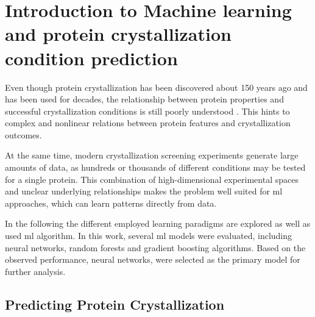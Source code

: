 \section{Introduction to Machine learning and protein crystallization condition prediction}\label{sec:machine_learning}
Even though protein crystallization has been discovered about 150 years ago and has been used for decades, the relationship between protein properties and successful crystallization conditions is still poorly understood \citep{McPherson2013}. This hints to complex and nonlinear relations between protein features and crystallization outcomes.

At the same time, modern crystallization screening experiments generate large amounts of data, as hundreds or thousands of different conditions may be tested for a single protein. This combination of high-dimensional experimental spaces and unclear underlying relationships makes the problem well suited for \gls{ml} approaches, which can learn patterns directly from data.

In the following the different employed learning paradigms are explored as well as used \gls{ml} algorithm. In this work, several \gls{ml} models were evaluated, including neural networks, random forests and gradient boosting algorithms. Based on the observed performance, neural networks, were selected as the primary model for further analysis.






\subsection*{Predicting Protein Crystallization}\label{sec:background:predictingPropensity}

